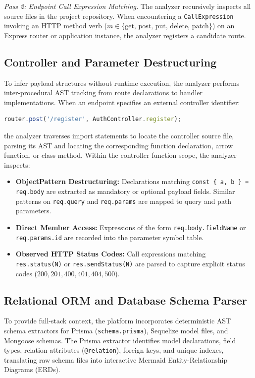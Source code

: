 \documentclass[a4paper,10pt]{article}
\begin{document}
\textit{Pass 2: Endpoint Call Expression Matching.} The analyzer recursively inspects all source files in the project repository. When encountering a \texttt{CallExpression} invoking an HTTP method verb ($m \in \{\text{get, post, put, delete, patch}\}$) on an Express router or application instance, the analyzer registers a candidate route.

\subsection{Controller and Parameter Destructuring}
\noindent
To infer payload structures without runtime execution, the analyzer performs inter-procedural AST tracking from route declarations to handler implementations. When an endpoint specifies an external controller identifier:
\begin{lstlisting}[language=JavaScript]
router.post('/register', AuthController.register);
\end{lstlisting}
the analyzer traverses import statements to locate the controller source file, parsing its AST and locating the corresponding function declaration, arrow function, or class method. Within the controller function scope, the analyzer inspects:
\begin{itemize}
  \setlength{\itemsep}{1pt}
  \item \textbf{ObjectPattern Destructuring:} Declarations matching \texttt{const \{ a, b \} = req.body} are extracted as mandatory or optional payload fields. Similar patterns on \texttt{req.query} and \texttt{req.params} are mapped to query and path parameters.
  \item \textbf{Direct Member Access:} Expressions of the form \texttt{req.body.fieldName} or \texttt{req.params.id} are recorded into the parameter symbol table.
  \item \textbf{Observed HTTP Status Codes:} Call expressions matching \texttt{res.status(N)} or \texttt{res.sendStatus(N)} are parsed to capture explicit status codes ($200, 201, 400, 401, 404, 500$).
\end{itemize}

\subsection{Relational ORM and Database Schema Parser}
\noindent
To provide full-stack context, the platform incorporates deterministic AST schema extractors for Prisma (\texttt{schema.prisma}), Sequelize model files, and Mongoose schemas. The Prisma extractor identifies model declarations, field types, relation attributes (\texttt{@relation}), foreign keys, and unique indexes, translating raw schema files into interactive Mermaid Entity-Relationship Diagrams (ERDs).
\end{document}
